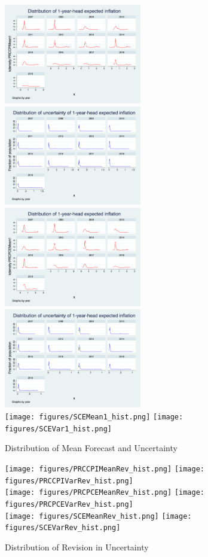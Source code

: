 \documentclass[]{article}
\begin{document}
\begin{figure}[h]\label{Unceratitny_Histogram}
	\centering
	\includegraphics[width=6cm]{figures/PRCCPIMean1_hist.png} 
	\includegraphics[width=6cm]{figures/PRCCPIVar1_hist.png}  \\
	\smallskip
		\includegraphics[width=6cm]{figures/PRCPCEMean1_hist.png} 
	\includegraphics[width=6cm]{figures/PRCPCEVar1_hist.png}  \\
	\smallskip
		\texttt{[image: figures/SCEMean1\_hist.png]} 
	\texttt{[image: figures/SCEVar1\_hist.png]}  \\
	\caption{Distribution of Mean Forecast and Uncertainty }
\end{figure}


\begin{figure}[h]\label{RevisionHist}
	\centering
	\texttt{[image: figures/PRCCPIMeanRev\_hist.png]} 
	\texttt{[image: figures/PRCCPIVarRev\_hist.png]}  \\
	\smallskip
	\texttt{[image: figures/PRCPCEMeanRev\_hist.png]} 
	\texttt{[image: figures/PRCPCEVarRev\_hist.png]}  \\
	\smallskip
		\texttt{[image: figures/SCEMeanRev\_hist.png]} 
	\texttt{[image: figures/SCEVarRev\_hist.png]}  \\
	\caption{Distribution of Revision in Uncertainty}
\end{figure}
\end{document}
